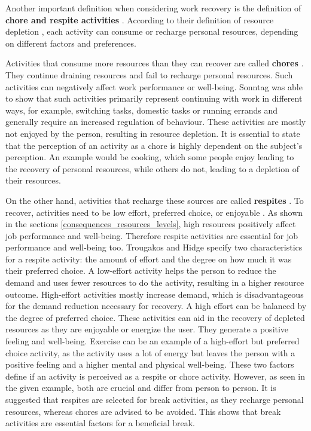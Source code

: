 \documentclass{hasel_thesis}
\begin{document}
Another important definition when considering work recovery is the definition of \textbf{chore and respite activities} \cite{Trougakos.2009}. According to their definition of resource depletion \cite{BaumeisterR.F.BratslavskyE.MuravenM.&TiceD.M..1998}, each activity can consume or recharge personal resources, depending on different factors and preferences. 

Activities that consume more resources than they can recover are called \textbf{chores} \cite{Trougakos.2009}. They continue draining resources and fail to recharge personal resources. Such activities can negatively affect work performance or well-being. Sonntag \cite{Sonnentag.2001} was able to show that such activities primarily represent continuing with work in different ways, for example, switching tasks, domestic tasks or running errands and generally require an increased regulation of behaviour. These activities are mostly not enjoyed by the person, resulting in resource depletion. It is essential to state that the perception of an activity as a chore is highly dependent on the subject's perception. An example would be cooking, which some people enjoy leading to the recovery of personal resources, while others do not, leading to a depletion of their resources.


On the other hand, activities that recharge these sources are called \textbf{respites} \cite{Trougakos.2009}. To recover, activities need to be low effort, preferred choice, or enjoyable \cite{Trougakos.2009}. As shown in the sections \ref{consequences_resources_levels}, high resources positively affect job performance and well-being. Therefore respite activities are essential for job performance and well-being too. Trougakos and Hidge \cite{Trougakos.2009} specify two characteristics for a respite activity: the amount of effort and the degree on how much it was their preferred choice. A low-effort activity helps the person to reduce the demand and uses fewer resources to do the activity, resulting in a higher resource outcome. High-effort activities mostly increase demand, which is disadvantageous for the demand reduction necessary for recovery. A high effort can be balanced by the degree of preferred choice. These activities can aid in the recovery of depleted resources as they are enjoyable or energize the user. They generate a positive feeling and well-being. Exercise can be an example of a high-effort but preferred choice activity, as the activity uses a lot of energy but leaves the person with a positive feeling and a higher mental and physical well-being. These two factors define if an activity is perceived as a respite or chore activity. However, as seen in the given example, both are crucial and differ from person to person. It is suggested that respites are selected for break activities, as they recharge personal resources, whereas chores are advised to be avoided. This shows that break activities are essential factors for a beneficial break.
\end{document}
